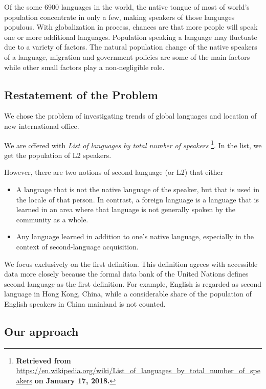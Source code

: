 \documentclass{mcmthesis}
\begin{document}
Of the some 6900 languages in the world, the native tongue of most of world's population concentrate in only a few, making speakers of those languages populous. With globalization in process, chances are that more people will speak one or more additional languages. Population speaking a language may fluctuate due to a variety of factors. The natural population change of the native speakers of a language, migration and government policies are some of the main factors while other small factors play a non-negligible role.

\subsection{Restatement of the Problem}

We chose the problem of investigating trends of global languages and location of new international office.

We are offered with \emph{List of languages by total number of speakers} \footnote{\textbf{Retrieved from} \url{https://en.wikipedia.org/wiki/List_of_languages_by_total_number_of_speakers} \textbf{on January 17, 2018.}}.  In the list, we get the population of L2 speakers.

However, there are two notions of second language (or L2) that either

\begin{itemize}

  \item A language that is not the native language of the speaker, but that is used in the locale of that person. In contrast, a foreign language is a language that is learned in an area where that language is not generally spoken by the community as a whole.

  \item Any language learned in addition to one's native language, especially in the context of second-language acquisition.

\end{itemize}


We focus exclusively on the first definition. This definition agrees with accessible data more closely because the formal data bank of the United Nations defines second language as the first definition. For example, English is regarded as second language in Hong Kong, China, while a considerable share of the population of English speakers in China mainland is not counted.

\subsection{Our approach}
\end{document}
